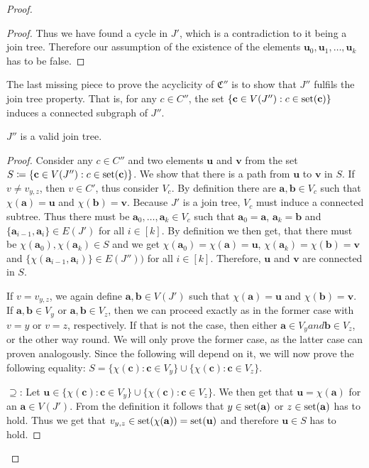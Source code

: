 \begin{proof}
\begin{proof}
		Thus we have found a cycle in $J'$, which is a contradiction to it being a join tree.
		Therefore our assumption of the existence of the elements $\mathbf u_0,\mathbf u_1,\dots,\mathbf u_k$ has to be false.
	\end{proof}
	
	The last missing piece to prove the acyclicity of $\mathfrak C''$ is to show that $J''$ fulfils the join tree property.
	That is, for any $c\in C''$, the set $\{\mathbf c\in V(J'') : c\in\operatorname{set}(\mathbf c)\}$ induces a connected subgraph of $J''$.
	
	\begin{claim}
		$J''$ is a valid join tree.
	\end{claim}
	\begin{proof}
		Consider any $c\in C''$ and two elements $\mathbf u$ and $\mathbf v$ from the set $S\coloneqq \{\mathbf c \in V(J'') : c\in \operatorname{set}(\mathbf c)\}$.
		We show that there is a path from $\mathbf u$ to $\mathbf v$ in $S$.
		If $v\neq v_{y,z}$, then $v\in C'$, thus consider $V_c$.
		By definition there are $\mathbf a,\mathbf b\in V_c$ such that $\chi(\mathbf a)=\mathbf u$ and $\chi(\mathbf b)=\mathbf v$.
		Because $J'$ is a join tree, $V_c$ must induce a connected subtree.
		Thus there must be $\mathbf a_0,\dots,\mathbf a_k\in V_c$ such that $\mathbf a_0=\mathbf a$, $\mathbf a_k=\mathbf b$ and $\{\mathbf a_{i-1},\mathbf a_i\}\in E(J')$ for all $i\in [k]$.
		By definition we then get, that there must be $\chi(\mathbf a_0),\chi(\mathbf a_k)\in S$ and we get $\chi(\mathbf a_0)=\chi(\mathbf a)=\mathbf u$, $\chi(\mathbf a_k)=\chi(\mathbf b)=\mathbf v$ and $\{\chi(\mathbf a_{i-1},\mathbf a_i)\}\in E(J''))$ for all $i\in[k]$.
		Therefore, $\mathbf u$ and $\mathbf v$ are connected in $S$.
		
		If $v=v_{y,z}$, we again define $\mathbf a,\mathbf b\in V(J')$ such that $\chi(\mathbf a)=\mathbf u$ and $\chi(\mathbf b)=\mathbf v$.
		If $\mathbf a,\mathbf b\in V_y$ or $\mathbf a,\mathbf b\in V_z$, then we can proceed exactly as in the former case with $v=y$ or $v=z$, respectively.
		If that is not the case, then either $\mathbf a\in V_y and \mathbf b\in V_z$, or the other way round.
		We will only prove the former case, as the latter case can proven analogously.
		Since the following will depend on it, we will now prove the following equality: $S=\{\chi(\mathbf c) : \mathbf c\in V_y\}\cup \{\chi(\mathbf c) : \mathbf c\in V_z\}$.
		
		$\supseteq$:
		Let $\mathbf u \in \{\chi(\mathbf c) : \mathbf c\in V_y\}\cup \{\chi(\mathbf c) : \mathbf c\in V_z\}$.
		We then get that $\mathbf u = \chi(\mathbf a)$ for an $\mathbf a\in V(J')$.
		From the definition it follows that $y\in \operatorname{set}(\mathbf a)$ or $z\in \operatorname{set}(\mathbf a)$ has to hold.
		Thus we get that $v_{y,z}\in \operatorname{set}(\chi(\mathbf a))=\operatorname{set}(\mathbf u)$ and therefore $\mathbf u\in S$ has to hold.
		

\end{proof}
\end{proof}
